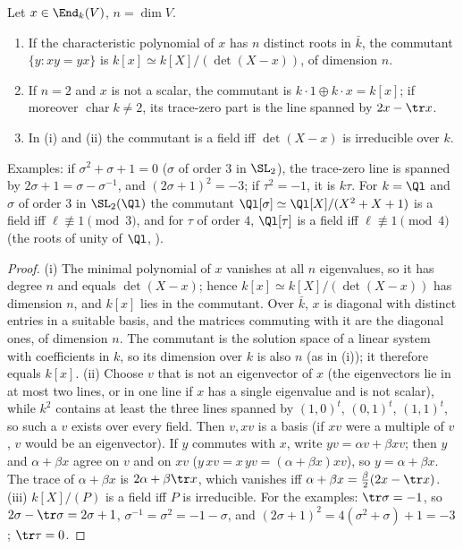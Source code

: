 \begin{lemma}\label{lem:reps:commutant}
Let $x\in\End_k(V)$, $n=\dim V$.
\begin{enumerate}[label=(\roman*)]
\item If the characteristic polynomial of $x$ has $n$ distinct roots in $\bar k$, the commutant $\{y:xy=yx\}$ is $k[x]\simeq k[X]/(\det(X-x))$, of
dimension $n$.
\item If $n=2$ and $x$ is not a scalar, the commutant is $k\cdot1\oplus k\cdot x=k[x]$; if moreover $\operatorname{char}k\ne2$, its trace-zero part is the line
spanned by $2x-\tr x$.
\item In (i) and (ii) the commutant is a field iff $\det(X-x)$ is irreducible over $k$.
\end{enumerate}
Examples: if $\sigma^2+\sigma+1=0$ ($\sigma$ of order $3$ in $\SL_2$), the trace-zero line is spanned by $2\sigma+1=\sigma-\sigma^{-1}$, and $(2\sigma+1)^2=-3$; if $\tau^2=-1$, it is $k\tau$.
For $k=\Ql$ and $\sigma$ of order $3$ in $\SL_2(\Ql)$ the commutant $\Ql[\sigma]\simeq\Ql[X]/(X^2+X+1)$ is a field iff $\ell\not\equiv1\pmod3$, and for $\tau$ of order $4$,
$\Ql[\tau]$ is a field iff $\ell\not\equiv1\pmod4$ (the roots of unity of $\Ql$, ).
\end{lemma}

\begin{proof}
(i) The minimal polynomial of $x$ vanishes at all $n$ eigenvalues, so it has degree $n$ and equals $\det(X-x)$; hence $k[x]\simeq k[X]/(\det(X-x))$ has
dimension $n$, and $k[x]$ lies in the commutant. Over $\bar k$, $x$ is diagonal with distinct entries in a suitable basis, and the matrices
commuting with it are the diagonal ones, of dimension $n$. The commutant is the solution space of a linear system with coefficients
in $k$, so its dimension over $k$ is also $n$ (as in (i)); it therefore equals $k[x]$.
(ii) Choose $v$ that is not an eigenvector of $x$ (the eigenvectors lie in at most two lines, or in one line if $x$ has a single eigenvalue
and is not scalar), while $k^2$ contains at least the three lines spanned by $(1,0)^t$, $(0,1)^t$, $(1,1)^t$, so such a $v$ exists over every
field. Then $v,xv$ is a basis (if $xv$ were a multiple of $v$, $v$ would be an eigenvector). If $y$ commutes with $x$, write $yv=\alpha v+\beta xv$; then $y$ and $\alpha+\beta x$ agree on $v$ and on $xv$
($y\,xv=x\,yv=(\alpha+\beta x)xv$), so $y=\alpha+\beta x$. The trace of $\alpha+\beta x$ is $2\alpha+\beta\tr x$, which vanishes iff $\alpha+\beta x=\frac\beta2(2x-\tr x)$.
(iii) $k[X]/(P)$ is a field iff $P$ is irreducible. For the examples: $\tr\sigma=-1$, so $2\sigma-\tr\sigma=2\sigma+1$, $\sigma^{-1}=\sigma^2=-1-\sigma$, and
$(2\sigma+1)^2=4(\sigma^2+\sigma)+1=-3$; $\tr\tau=0$.
\end{proof}

